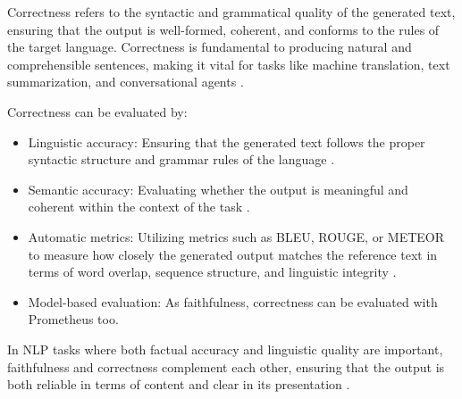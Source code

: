 Correctness refers to the syntactic and grammatical quality of the generated text, ensuring that the output is well-formed, coherent, and conforms to the rules of the target language. Correctness is fundamental to producing natural and comprehensible sentences, making it vital for tasks like machine translation, text summarization, and conversational agents \cite{yao2023predictinggeneralizationperformancecorrectness}.

Correctness can be evaluated by: \begin{itemize} \item Linguistic accuracy: Ensuring that the generated text follows the proper syntactic structure and grammar rules of the language \cite{varshney-etal-2022-towards}. \item Semantic accuracy: Evaluating whether the output is meaningful and coherent within the context of the task \cite{steen2023littlepushnlimodels}. \item Automatic metrics: Utilizing metrics such as BLEU, ROUGE, or METEOR to measure how closely the generated output matches the reference text in terms of word overlap, sequence structure, and linguistic integrity \cite{gat2023faithfulexplanationsblackboxnlp}. \item Model-based evaluation: As faithfulness, correctness can be evaluated with Prometheus too\cite{kim2024prometheus2opensource}.\end{itemize}

In NLP tasks where both factual accuracy and linguistic quality are important, faithfulness and correctness complement each other, ensuring that the output is both reliable in terms of content and clear in its presentation \cite{jacovi-goldberg-2020-towards}.

